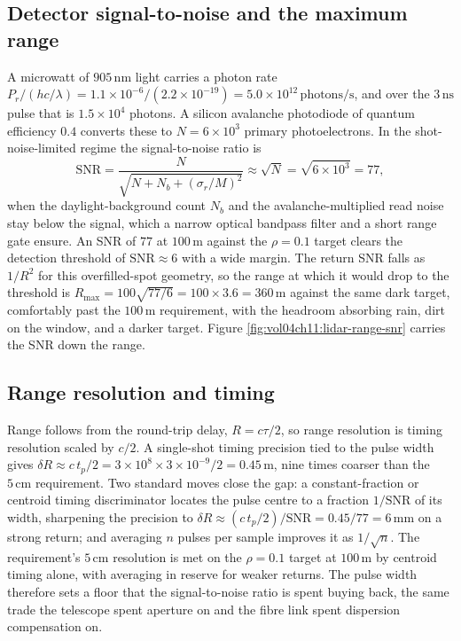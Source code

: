 \subsection{Detector signal-to-noise and the maximum range}

A microwatt of $905\,\si{\nano\meter}$ light carries a photon rate
$P_{r}/(hc/\lambda) = 1.1\times10^{-6}/(2.2\times10^{-19}) =
5.0\times10^{12}\,\text{photons}/\si{\second}$, and over the
$3\,\si{\nano\second}$ pulse that is
$1.5\times10^{4}$ photons. A silicon avalanche photodiode of quantum
efficiency $0.4$ converts these to $N = 6\times10^{3}$ primary photoelectrons.
In the shot-noise-limited regime the signal-to-noise ratio is
\[
\text{SNR} = \frac{N}{\sqrt{N + N_{b} + (\sigma_{r}/M)^{2}}}
\approx \sqrt{N} = \sqrt{6\times10^{3}} = 77,
\]
when the daylight-background count $N_{b}$ and the avalanche-multiplied read
noise stay below the signal, which a narrow optical bandpass filter and a short
range gate ensure. An SNR of $77$ at $100\,\si{\meter}$ against the
$\rho = 0.1$ target clears the detection threshold of $\text{SNR}\approx 6$
with a wide margin. The return SNR falls as $1/R^{2}$ for this overfilled-spot
geometry, so the range at which it would drop to the threshold is
$R_{\max} = 100\sqrt{77/6} = 100\times 3.6 = 360\,\si{\meter}$ against the same
dark target, comfortably past the $100\,\si{\meter}$ requirement, with the
headroom absorbing rain, dirt on the window, and a darker target. Figure
\ref{fig:vol04ch11:lidar-range-snr} carries the SNR down the range.



\subsection{Range resolution and timing}

Range follows from the round-trip delay, $R = c\tau/2$, so range resolution is
timing resolution scaled by $c/2$. A single-shot timing precision tied to the
pulse width gives
$\delta R \approx c\,t_{p}/2 = 3\times10^{8}\times 3\times10^{-9}/2 =
0.45\,\si{\meter}$, nine times coarser than the $5\,\si{\centi\meter}$
requirement. Two standard moves close the gap: a constant-fraction or
centroid timing discriminator locates the pulse centre to a fraction
$1/\text{SNR}$ of its width, sharpening the precision to
$\delta R \approx (c\,t_{p}/2)/\text{SNR} = 0.45/77 = 6\,\si{\milli\meter}$ on
a strong return; and averaging $n$ pulses per sample improves it as
$1/\sqrt{n}$. The requirement's $5\,\si{\centi\meter}$ resolution is met on the
$\rho = 0.1$ target at $100\,\si{\meter}$ by centroid timing alone, with
averaging in reserve for weaker returns. The pulse width therefore sets a
floor that the signal-to-noise ratio is spent buying back, the same trade the
telescope spent aperture on and the fibre link spent dispersion compensation
on.

